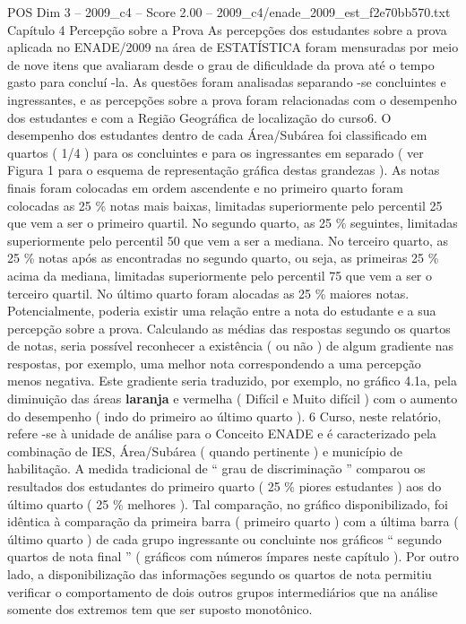 \begin{textsample}{POS Dim 3 – 2009\_c4 – Score 2.00 – 2009\_c4/enade\_2009\_est\_f2e70bb570.txt}  \label{ex:f3_pos_121}
Capítulo 4 Percepção sobre a Prova As percepções dos estudantes sobre a prova aplicada no ENADE/2009 na área de ESTATÍSTICA foram mensuradas por meio de nove itens que avaliaram desde o grau de dificuldade da prova até o tempo gasto para concluí -la.
As questões foram analisadas separando -se concluintes e ingressantes, e as percepções sobre a prova foram relacionadas com o desempenho dos estudantes e com a Região Geográfica de localização do curso6.
O desempenho dos estudantes dentro de cada Área/Subárea foi classificado em quartos ( 1/4 ) para os concluintes e para os ingressantes em separado ( ver Figura 1 para o esquema de representação gráfica destas grandezas ).
As notas finais foram colocadas em ordem ascendente e no primeiro quarto foram colocadas as 25 \% notas mais baixas, limitadas superiormente pelo percentil 25 que vem a ser o primeiro quartil.
No segundo quarto, as 25 \% seguintes, limitadas superiormente pelo percentil 50 que vem a ser a mediana.
No terceiro quarto, as 25 \% notas após as encontradas no segundo quarto, ou seja, as primeiras 25 \% acima da mediana, limitadas superiormente pelo percentil 75 que vem a ser o terceiro quartil.
No último quarto foram alocadas as 25 \% maiores notas.
Potencialmente, poderia existir uma relação entre a nota do estudante e a sua percepção sobre a prova.
Calculando as médias das respostas segundo os quartos de notas, seria possível reconhecer a existência ( ou não ) de algum gradiente nas respostas, por exemplo, uma melhor nota correspondendo a uma percepção menos negativa.
Este gradiente seria traduzido, por exemplo, no gráfico 4.1a, pela diminuição das áreas \textbf{laranja} e vermelha ( Difícil e Muito difícil ) com o aumento do desempenho ( indo do primeiro ao último quarto ). 6 Curso, neste relatório, refere -se à unidade de análise para o Conceito ENADE e é caracterizado pela combinação de IES, Área/Subárea ( quando pertinente ) e município de habilitação.
A medida tradicional de “ grau de discriminação ” comparou os resultados dos estudantes do primeiro quarto ( 25 \% piores estudantes ) aos do último quarto ( 25 \% melhores ).
Tal comparação, no gráfico disponibilizado, foi idêntica à comparação da primeira barra ( primeiro quarto ) com a última barra ( último quarto ) de cada grupo ingressante ou concluinte nos gráficos “ segundo quartos de nota final ” ( gráficos com números ímpares neste capítulo ).
Por outro lado, a disponibilização das informações segundo os quartos de nota permitiu verificar o comportamento de dois outros grupos intermediários que na análise somente dos extremos tem que ser suposto monotônico.

\end{textsample}
